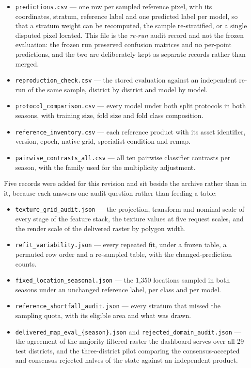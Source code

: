 \documentclass[conference]{IEEEtran}
\begin{document}
\begin{itemize}
    \item \texttt{predictions.csv} --- one row per sampled reference pixel, with its coordinates, stratum, reference label and one predicted label per model, so that a stratum weight can be recomputed, the sample re-stratified, or a single disputed pixel located. This file is the \emph{re-run} audit record and not the frozen evaluation: the frozen run preserved confusion matrices and no per-point predictions, and the two are deliberately kept as separate records rather than merged.
    \item \texttt{reproduction\_check.csv} --- the stored evaluation against an independent re-run of the same sample, district by district and model by model.
    \item \texttt{protocol\_comparison.csv} --- every model under both split protocols in both seasons, with training size, fold size and fold class composition.
    \item \texttt{reference\_inventory.csv} --- each reference product with its asset identifier, version, epoch, native grid, specialist condition and remap.
    \item \texttt{pairwise\_contrasts\_all.csv} --- all ten pairwise classifier contrasts per season, with the family used for the multiplicity adjustment.
\end{itemize}

Five records were added for this revision and sit beside the archive rather than in it, because each answers one audit question rather than feeding a table:

\begin{itemize}
    \item \texttt{texture\_grid\_audit.json} --- the projection, transform and nominal scale of every stage of the feature stack, the texture values at five request scales, and the render scale of the delivered raster by polygon width.
    \item \texttt{refit\_variability.json} --- every repeated fit, under a frozen table, a permuted row order and a re-sampled table, with the changed-prediction counts.
    \item \texttt{fixed\_location\_seasonal.json} --- the 1{,}350 locations sampled in both seasons under an unchanged reference label, per class and per model.
    \item \texttt{reference\_shortfall\_audit.json} --- every stratum that missed the sampling quota, with its eligible area and what was drawn.
    \item \texttt{delivered\_map\_eval\_\{season\}.json} and \texttt{rejected\_domain\_audit.json} --- the agreement of the majority-filtered raster the dashboard serves over all 29 test districts, and the three-district pilot comparing the consensus-accepted and consensus-rejected halves of the state against an independent product.
\end{itemize}
\end{document}
